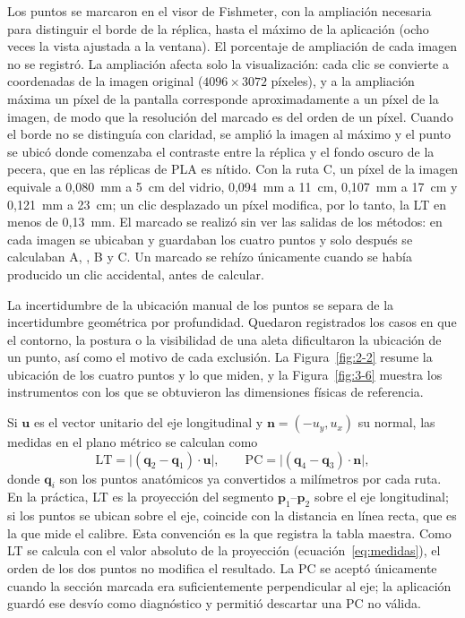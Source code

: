 Los puntos se marcaron en el visor de Fishmeter, con la ampliación necesaria para distinguir el borde de la réplica, hasta el máximo de la aplicación (ocho veces la vista ajustada a la ventana). El porcentaje de ampliación de cada imagen no se registró. La ampliación afecta solo la visualización: cada clic se convierte a coordenadas de la imagen original ($4096 \times 3072$ píxeles), y a la ampliación máxima un píxel de la pantalla corresponde aproximadamente a un píxel de la imagen, de modo que la resolución del marcado es del orden de un píxel. Cuando el borde no se distinguía con claridad, se amplió la imagen al máximo y el punto se ubicó donde comenzaba el contraste entre la réplica y el fondo oscuro de la pecera, que en las réplicas de PLA es nítido. Con la ruta C, un píxel de la imagen equivale a 0,080~mm a 5~cm del vidrio, 0,094~mm a 11~cm, 0,107~mm a 17~cm y 0,121~mm a 23~cm; un clic desplazado un píxel modifica, por lo tanto, la LT en menos de 0,13~mm. El marcado se realizó sin ver las salidas de los métodos: en cada imagen se ubicaban y guardaban los cuatro puntos y solo después se calculaban A, \Aprime, B y C. Un marcado se rehízo únicamente cuando se había producido un clic accidental, antes de calcular.

La incertidumbre de la ubicación manual de los puntos se separa de la incertidumbre geométrica por profundidad. Quedaron registrados los casos en que el contorno, la postura o la visibilidad de una aleta dificultaron la ubicación de un punto, así como el motivo de cada exclusión. La Figura~\ref{fig:2-2} resume la ubicación de los cuatro puntos y lo que miden, y la Figura~\ref{fig:3-6} muestra los instrumentos con los que se obtuvieron las dimensiones físicas de referencia.

Si $\mathbf{u}$ es el vector unitario del eje longitudinal y $\mathbf{n} = (-u_y, u_x)$ su normal, las medidas en el plano métrico se calculan como
\begin{equation}
\mathrm{LT} = \lvert (\mathbf{q}_2 - \mathbf{q}_1)\cdot\mathbf{u} \rvert, \qquad
\mathrm{PC} = \lvert (\mathbf{q}_4 - \mathbf{q}_3)\cdot\mathbf{n} \rvert,
\label{eq:medidas}
\end{equation}
donde $\mathbf{q}_i$ son los puntos anatómicos ya convertidos a milímetros por cada ruta. En la práctica, LT es la proyección del segmento $\mathbf{p}_1$--$\mathbf{p}_2$ sobre el eje longitudinal; si los puntos se ubican sobre el eje, coincide con la distancia en línea recta, que es la que mide el calibre. Esta convención es la que registra la tabla maestra. Como LT se calcula con el valor absoluto de la proyección (ecuación~\ref{eq:medidas}), el orden de los dos puntos no modifica el resultado. La PC se aceptó únicamente cuando la sección marcada era suficientemente perpendicular al eje; la aplicación guardó ese desvío como diagnóstico y permitió descartar una PC no válida.

